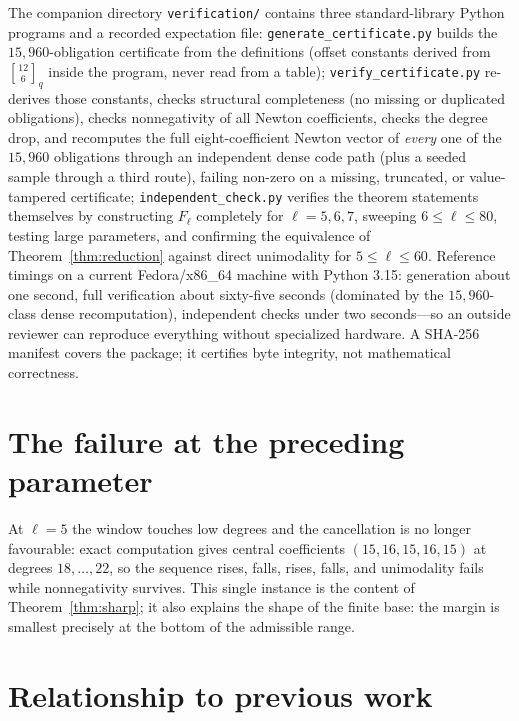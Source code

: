 \documentclass[11pt]{article}
\theoremstyle{definition}
\newcommand{\gauss}[2]{\genfrac{[}{]}{0pt}{0}{#1}{#2}_q}
\begin{document}
The companion directory \texttt{verification/} contains three standard-library Python programs and a
recorded expectation file:
\texttt{generate\_certificate.py} builds the $15{,}960$-obligation certificate from the definitions
(offset constants derived from $\gauss{12}{6}$ inside the program, never read from a table);
\texttt{verify\_certificate.py} re-derives those constants, checks structural completeness (no
missing or duplicated obligations), checks nonnegativity of all Newton coefficients, checks the
degree drop, and recomputes the full eight-coefficient Newton vector of \emph{every} one of the
$15{,}960$ obligations through an independent dense code path (plus a seeded sample through a
third route), failing non-zero on a missing, truncated, or value-tampered certificate;
\texttt{independent\_check.py} verifies the theorem statements themselves by constructing $F_\ell$
completely for $\ell=5,6,7$, sweeping $6\le\ell\le80$, testing large parameters, and confirming the
equivalence of Theorem~\ref{thm:reduction} against direct unimodality for $5\le\ell\le60$. Reference
timings on a current Fedora/x86\_64 machine with Python 3.15: generation about one second, full
verification about sixty-five seconds (dominated by the $15{,}960$-class dense recomputation),
independent checks under two seconds---so an outside reviewer can reproduce everything without
specialized hardware. A SHA-256 manifest covers the package;
it certifies byte integrity, not mathematical correctness.

\section{The failure at the preceding parameter}

At $\ell=5$ the window touches low degrees and the cancellation is no longer favourable: exact
computation gives central coefficients $(15,16,15,16,15)$ at degrees $18,\dots,22$, so the sequence
rises, falls, rises, falls, and unimodality fails while nonnegativity survives. This single instance
is the content of Theorem~\ref{thm:sharp}; it also explains the shape of the finite base: the margin
is smallest precisely at the bottom of the admissible range.

\section{Relationship to previous work}\label{sec:prior}
\end{document}
